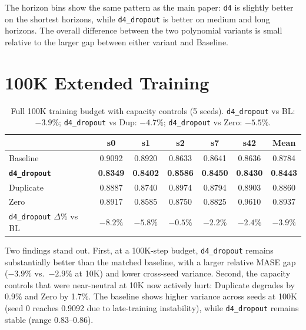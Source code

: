 \documentclass{article}
\begin{document}
The horizon bins show the same pattern as the main paper: \texttt{d4} is slightly better on the shortest horizons, while \texttt{d4\_dropout} is better on medium and long horizons. The overall difference between the two polynomial variants is small relative to the larger gap between either variant and Baseline.

\section{100K Extended Training}
\label{app:100k}

\begin{table}[H]
\centering
\caption{Full 100K training budget with capacity controls (5 seeds). \texttt{d4\_dropout} vs BL: $-3.9\%$; \texttt{d4\_dropout} vs Dup: $-4.7\%$; \texttt{d4\_dropout} vs Zero: $-5.5\%$.}
\small
\begin{tabular}{lcccccc}
\toprule
& \textbf{s0} & \textbf{s1} & \textbf{s2} & \textbf{s7} & \textbf{s42} & \textbf{Mean} \\
\midrule
Baseline & 0.9092 & 0.8920 & 0.8633 & 0.8641 & 0.8636 & 0.8784 \\
\textbf{\texttt{d4\_dropout}} & \textbf{0.8349} & \textbf{0.8402} & \textbf{0.8586} & \textbf{0.8450} & \textbf{0.8430} & \textbf{0.8443} \\
Duplicate & 0.8887 & 0.8740 & 0.8974 & 0.8794 & 0.8903 & 0.8860 \\
Zero & 0.8917 & 0.8585 & 0.8750 & 0.8825 & 0.9610 & 0.8937 \\
\midrule
\texttt{d4\_dropout} $\Delta$\% vs BL & $-8.2\%$ & $-5.8\%$ & $-0.5\%$ & $-2.2\%$ & $-2.4\%$ & $-3.9\%$ \\
\bottomrule
\end{tabular}
\end{table}

Two findings stand out. First, at a 100K-step budget, \texttt{d4\_dropout} remains substantially better than the matched baseline, with a larger relative MASE gap ($-3.9\%$ vs.\ $-2.9\%$ at 10K) and lower cross-seed variance. Second, the capacity controls that were near-neutral at 10K now actively hurt: Duplicate degrades by 0.9\% and Zero by 1.7\%. The baseline shows higher variance across seeds at 100K (seed 0 reaches 0.9092 due to late-training instability), while \texttt{d4\_dropout} remains stable (range 0.83--0.86).
\end{document}
